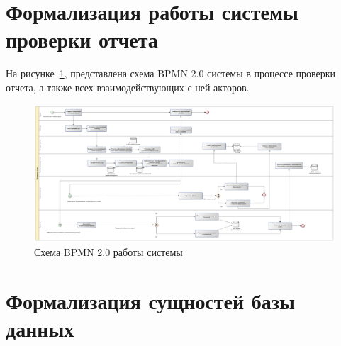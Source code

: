 \section{Формализация работы системы проверки отчета}
На рисунке~\ref{img:main_sys_bpmn}, представлена схема BPMN 2.0 системы в процессе проверки отчета, а также всех взаимодействующих с ней акторов.
 \begin{figure}
	\includegraphics[width=\textheight]{./inc/img/process_check_bpmn.pdf}
	  \caption{Схема BPMN 2.0 работы системы}
	\label{img:main_sys_bpmn}
\end{figure}


\section{Формализация сущностей базы данных}

